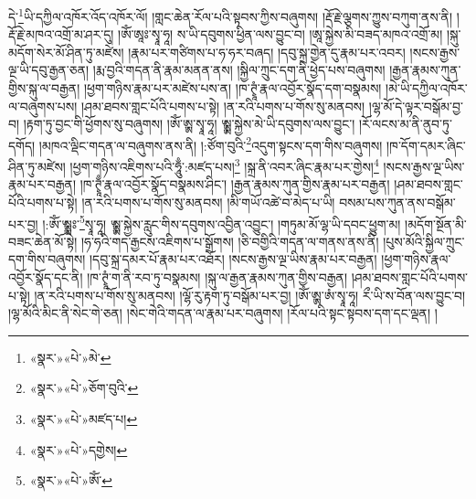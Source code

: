དེ་\footnote{«སྣར་»«པེ་»མེ་}ཡི་དཀྱིལ་འཁོར་འོད་འཁོར་ལོ། །གླང་ཆེན་རོལ་པའི་སྟབས་ཀྱིས་བཞུགས། །རྡོ་རྗེ་ལྕགས་ཀྱུས་བཀུག་ནས་ནི། །རྡོ་རྗེ་མཁའ་འགྲོ་མ་ཤར་དུ། །ཨོཾ་ཨཱཿ་སྭཱ་ཧཱ། ས་ཡི་དབུགས་ཕྱིན་ལས་བྱུང་བ། །ཨཱ་སྐྱེས་མི་བཟད་མཁའ་འགྲོ་མ། །སྐུ་མདོག་སེར་མོ་ཤིན་ཏུ་མཛེས། །རྣམ་པར་གཙིགས་པ་ཧ་ཧར་བཞད། །དབུ་སྐྲ་གྱེན་དུ་རྣམ་པར་འབར། །སངས་རྒྱས་ལྔ་ཡི་དབུ་རྒྱན་ཅན། །རྨ་བྱའི་གདན་ནི་རྣམ་མནན་ནས། །སྐྱིལ་ཀྲུང་དག་ནི་ཕྱེད་པས་བཞུགས། །རྒྱན་རྣམས་ཀུན་གྱིས་སྐུ་ལ་བརྒྱན། །ཕྱག་གཉིས་རྣམ་པར་མཛེས་པས་ན། །ཁ་ཊྭཱཾ་རྣལ་འབྱོར་སྣོད་དག་བསྣམས། །མེ་ཡི་དཀྱིལ་འཁོར་ལ་བཞུགས་པས། །ཤམ་ཐབས་གླང་པོའི་པགས་པ་སྟེ། །ན་རའི་པགས་པ་གོས་སུ་མནབས། །ལྷ་མོ་དེ་ལྟར་བསྒོམ་བྱ་བ། །རྟག་ཏུ་བྱང་གི་ཕྱོགས་སུ་བཞུགས། །ཨོཾ་ཨྸ་སྭཱ་ཧཱ། ཨྸྸ་སྐྱེས་མེ་ཡི་དབུགས་ལས་བྱུང་། །རོ་ལངས་མ་ནི་ནུབ་ཏུ་དགོད། །མཁའ་ལྡིང་གདན་ལ་བཞུགས་ནས་ནི། །:ཙོག་བུའི་\footnote{«སྣར་»«པེ་»ཅོག་བུའི་}འདུག་སྟངས་དག་གིས་བཞུགས། །ཁ་དོག་དམར་ཞིང་ཤིན་ཏུ་མཛེས། །ཕྱག་གཉིས་འཇིགས་པའི་ཧཱུྃ་:མཛད་པས།\footnote{«སྣར་»«པེ་»མཛད་པ།} །སྐྲ་ནི་འབར་ཞིང་རྣམ་པར་གྱེས།\footnote{«སྣར་»«པེ་»དགྱེས།} །སངས་རྒྱས་ལྔ་ཡིས་རྣམ་པར་བརྒྱན། །ཁ་ཊྭཱྃ་རྣལ་འབྱོར་སྣོད་བསྣམས་ཤིང་། །རྒྱན་རྣམས་ཀུན་གྱིས་རྣམ་པར་བརྒྱན། །ཤམ་ཐབས་གླང་པོའི་པགས་པ་སྟེ། །ན་རའི་པགས་པ་གོས་སུ་མནབས། །མི་གཡོ་འཚེ་བ་མེད་པ་ཡི། བསམ་པས་ཀུན་ནས་བསྒོམ་པར་བྱ། །:ཨོཾ་ཨྸྸཿ་\footnote{«སྣར་»«པེ་»ཨོཾ་}སྭཱ་ཧཱ། ཨྸྸ་སྐྱེས་རླུང་གིས་དབུགས་འབྱིན་འབྱུང་། །གཏུམ་མོ་ལྷ་ཡི་དབང་ཕྱུག་མ། །མདོག་སྔོན་མི་བཟང་ཆེན་མོ་སྟེ། །ཧ་ཧའི་གད་རྒྱངས་འཇིགས་པ་སྒྲོགས། །ཅི་བགྱིའི་གདན་ལ་གནས་ནས་ནི། །པུས་མོའི་སྐྱིལ་ཀྲུང་དག་གིས་བཞུགས། །དབུ་སྐྲ་དམར་པོ་རྣམ་པར་འཐོར། །སངས་རྒྱས་ལྔ་ཡིས་རྣམ་པར་བརྒྱན། །ཕྱག་གཉིས་རྣལ་འབྱོར་སྣོད་དང་ནི། །ཁ་ཊྭཱཾ་ག་ནི་རབ་ཏུ་བསྣམས། །སྐུ་ལ་རྒྱན་རྣམས་ཀུན་གྱིས་བརྒྱན། །ཤམ་ཐབས་གླང་པོའི་པགས་པ་སྟེ། །ན་རའི་པགས་པ་གོས་སུ་མནབས། །ལྷོ་རུ་རྟག་ཏུ་བསྒོམ་པར་བྱ། །ཨོཾ་ཨྸ་ཨཾ་སྭཱ་ཧཱ། རྀ་ཡི་ས་བོན་ལས་བྱུང་བ། །ལྷ་མོའི་མིང་ནི་སེང་གེ་ཅན། །སེང་གེའི་གདན་ལ་རྣམ་པར་བཞུགས། །རོལ་པའི་སྟང་སྟབས་དག་དང་ལྡན། །
